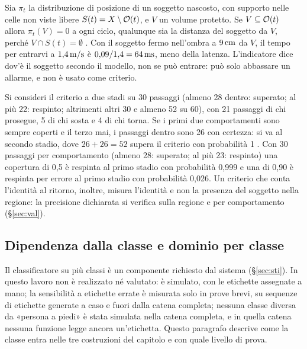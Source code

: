 \begin{osservazione}\label{oss:occ-intrusione}
Sia $\pi_t$ la distribuzione di posizione di un soggetto nascosto, con supporto nelle celle non viste libere $S(t)=X\setminus\mathcal{O}(t)$, e $V$ un volume protetto. Se $V\subseteq\mathcal{O}(t)$ allora $\pi_t(V)=0$ a ogni ciclo, qualunque sia la distanza del soggetto da $V$, perché $V\cap S(t)=\emptyset$ . Con il soggetto fermo nell'ombra a $9\,\mathrm{cm}$ da $V$, il tempo per entrarvi a $1{,}4\,\mathrm{m/s}$ è $0{,}09/1{,}4=64\,\mathrm{ms}$, meno della latenza. L'indicatore dice dov'è il soggetto secondo il modello, non se può entrare: può solo abbassare un allarme, e non è usato come criterio.
\end{osservazione}

\begin{osservazione}\label{oss:occ-criterio}
Si consideri il criterio a due stadi su 30 passaggi (almeno 28 dentro: superato; al più 22: respinto; altrimenti altri 30 e almeno 52 su 60), con 21 passaggi di chi prosegue, 5 di chi sosta e 4 di chi torna. Se i primi due comportamenti sono sempre coperti e il terzo mai, i passaggi dentro sono 26 con certezza: si va al secondo stadio, dove $26+26=52$ supera il criterio con probabilità 1 . Con 30 passaggi per comportamento (almeno 28: superato; al più 23: respinto) una copertura di 0,5 è respinta al primo stadio con probabilità 0,999 e una di 0,90 è respinta per errore al primo stadio con probabilità 0,026. Un criterio che conta l'identità al ritorno, inoltre, misura l'identità e non la presenza del soggetto nella regione: la precisione dichiarata si verifica sulla regione e per comportamento (\S\ref{sec:val}).
\end{osservazione}

\subsection{Dipendenza dalla classe e dominio per classe}\label{sec:occ-classe}

Il classificatore su più classi è un componente richiesto dal sistema (\S\ref{sec:sti}). In questo lavoro non è realizzato né valutato: è simulato, con le etichette assegnate a mano; la sensibilità a etichette errate è misurata solo in prove brevi, su sequenze di etichette generate a caso e fuori dalla catena completa; nessuna classe diversa da «persona a piedi» è stata simulata nella catena completa, e in quella catena nessuna funzione legge ancora un'etichetta. Questo paragrafo descrive come la classe entra nelle tre costruzioni del capitolo e con quale livello di prova.

